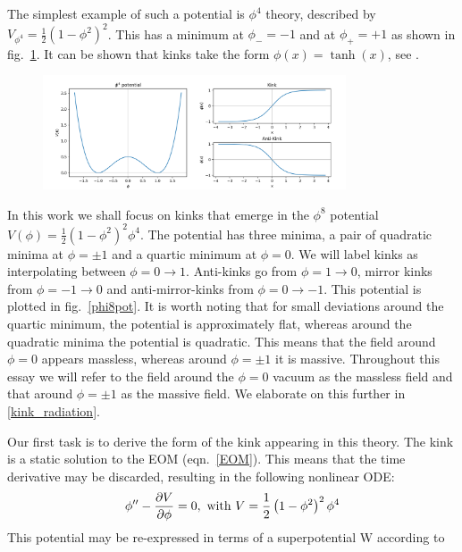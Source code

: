 \documentclass[11pt, oneside]{article}  	%
\numberwithin{equation}{section}
\begin{document}
 The simplest example of such a potential is $\phi^4$ theory, described by $V_{\phi^4} = \frac{1}{2} (1-\phi^2)^2$. This has a minimum at $\phi_{-} = -1$ and at $\phi_{+} = +1$ as shown in fig.~\ref{phi4pot}. It can be shown that kinks take the form $\phi(x) = \tanh(x)$, see \cite{manton-book}.\par
 \begin{figure}
\centering
 \includegraphics[width=0.8\textwidth]{phi4_potential.png}
  \label{phi4pot}
\end{figure}
 In this work we shall focus on kinks that emerge in the $\phi^8$ potential $V(\phi) = \frac{1}{2} \left ( 1 - \phi^2\right)^2 \phi^4$. The potential has three minima, a pair of quadratic minima at $\phi = \pm1$ and a quartic minimum at $\phi= 0$. We will label kinks as interpolating between $\phi = 0 \rightarrow 1$. Anti-kinks go from $\phi = 1 \rightarrow 0$, mirror kinks from $\phi = -1 \rightarrow 0$ and anti-mirror-kinks from $\phi = 0\rightarrow -1$. This potential is plotted in fig.~\ref{phi8pot}. It is worth noting that for small deviations around the quartic minimum, the potential is approximately flat, whereas around the quadratic minima the potential is quadratic. This means that the field around $\phi = 0$ appears massless, whereas around $\phi = \pm1$ it is massive. Throughout this essay we will refer to the field around the $\phi = 0$ vacuum as the massless field and that around $\phi = \pm1$ as the massive field. We elaborate on this further in \textsection \ref{kink_radiation}.\par
 Our first task is to derive the form of the kink appearing in this theory. The kink is a static solution to the EOM (eqn.~\ref{EOM}). This means that the time derivative may be discarded, resulting in the following nonlinear ODE:
 \begin{equation} \label{kink_equation}
 {\phi}'' - \frac{\partial V}{\partial \phi} = 0, \textup{ with } V = \frac{1}{2} \left ( 1 - \phi^2\right)^2 \phi^4
 \end{equation}
 This potential may be re-expressed in terms of a superpotential W according to
\end{document}
